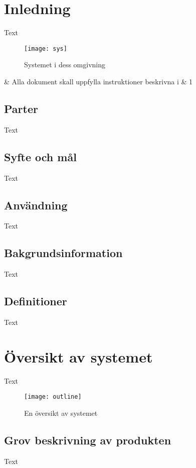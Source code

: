 \documentclass[10pt,oneside,swedish]{lips}
\begin{document}
\cleardoublepage
{}\cfoot{\thepage}

\section{Inledning}
\label{sec:inledning}

Text
\begin{figure}[htbp]
  \centering
  \texttt{[image: sys]}
  \caption{Systemet i dess omgivning}
  \label{fig:sys}
\end{figure}

\begin{requirements}
  \requirementno & Alla dokument skall uppfylla instruktioner
  beskrivna i \citep{spraknamnd:2000} & 1\\
\end{requirements}

\subsection{Parter}
Text

\subsection{Syfte och mål}
Text

\subsection{Användning}
Text

\subsection{Bakgrundsinformation}
Text

\subsection{Definitioner}
Text

\section{Översikt av systemet}
Text
\begin{figure}[htbp]
  \centering
  \texttt{[image: outline]}
  \caption{En översikt av systemet}
  \label{fig:oversikt}
\end{figure}

\subsection{Grov beskrivning av produkten}
Text
\end{document}
